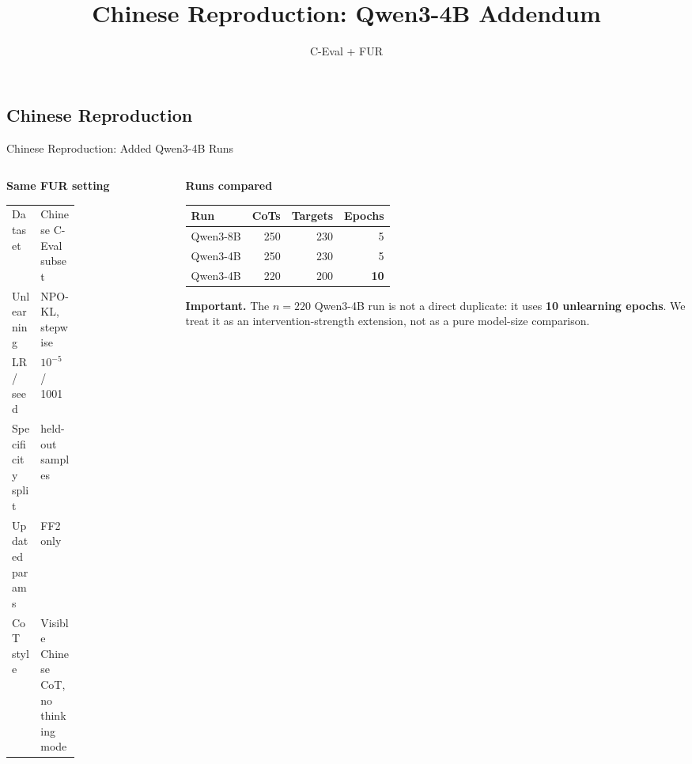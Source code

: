 \documentclass[aspectratio=169,10pt]{beamer}
\title{Chinese Reproduction: Qwen3-4B Addendum}
\author{C-Eval + FUR}
\date{}
\newcommand{\markgreen}[1]{\textcolor{accentgreen}{\textbf{#1}}}
\begin{document}
\subsection{Chinese Reproduction}

\begin{frame}{Chinese Reproduction: Added Qwen3-4B Runs}
\small
\begin{columns}[T,onlytextwidth]
  \begin{column}{0.48\textwidth}
    \textbf{Same FUR setting}

    \vspace{0.3em}
    \begin{tabularx}{\linewidth}{p{0.42\linewidth}>{\raggedright\arraybackslash}X}
      \toprule
      Dataset & Chinese C-Eval subset \\
      Unlearning & NPO-KL, stepwise \\
      LR / seed & \(10^{-5}\) / 1001 \\
      Specificity split & 20 held-out samples \\
      Updated params & FF2 only \\
      CoT style & Visible Chinese CoT, no thinking mode \\
      \bottomrule
    \end{tabularx}
  \end{column}

  \begin{column}{0.48\textwidth}
    \textbf{Runs compared}

    \vspace{0.3em}
    \begin{tabularx}{\linewidth}{X r r r}
      \toprule
      Run & CoTs & Targets & Epochs \\
      \midrule
      Qwen3-8B & 250 & 230 & 5 \\
      Qwen3-4B & 250 & 230 & 5 \\
      Qwen3-4B & 220 & 200 & \markgreen{10} \\
      \bottomrule
    \end{tabularx}

    \vspace{0.8em}
    \textbf{Important.}
    The \(n=220\) Qwen3-4B run is not a direct duplicate:
    it uses \markgreen{10 unlearning epochs}. We treat it as an intervention-strength
    extension, not as a pure model-size comparison.
  \end{column}
\end{columns}
\end{frame}
\end{document}
